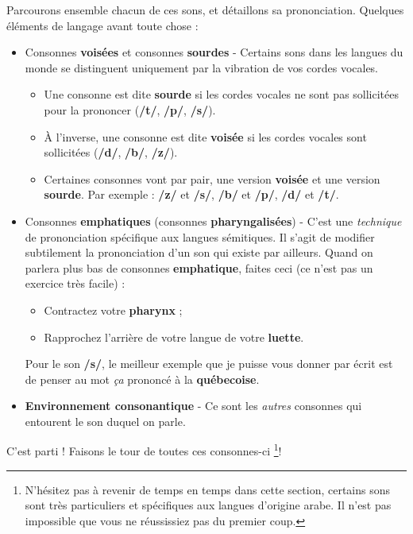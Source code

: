 Parcourons ensemble chacun de ces sons, et détaillons sa prononciation. Quelques éléments de langage avant toute chose :
\begin{itemize}
    \item Consonnes \textbf{voisées} et consonnes \textbf{sourdes} - Certains sons dans les langues du monde se distinguent uniquement par la vibration de vos cordes vocales. 
    \begin{itemize}
        \item Une consonne est dite \textbf{sourde} si les cordes vocales ne sont pas sollicitées pour la prononcer (\textbf{/t/}, \textbf{/p/}, \textbf{/s/}).
        \item À l'inverse, une consonne est dite \textbf{voisée} si les cordes vocales sont sollicitées (\textbf{/d/}, \textbf{/b/}, \textbf{/z/}).
        \item Certaines consonnes vont par pair, une version \textbf{voisée} et une version \textbf{sourde}. Par exemple : \textbf{/z/} et \textbf{/s/}, \textbf{/b/} et \textbf{/p/}, \textbf{/d/} et \textbf{/t/}.
    \end{itemize}
    \item Consonnes \textbf{emphatiques} (consonnes \textbf{pharyngalisées}) - C'est une \textit{technique} de prononciation spécifique aux langues sémitiques. Il s'agit de modifier subtilement la prononciation d'un son qui existe par ailleurs. Quand on parlera plus bas de consonnes \textbf{emphatique}, faites ceci (ce n'est pas un exercice très facile) :
    \begin{itemize}
        \item Contractez votre \textbf{pharynx} ; 
        \item Rapprochez l'arrière de votre langue de votre \textbf{luette}.
    \end{itemize}
    Pour le son \textbf{/s/}, le meilleur exemple que je puisse vous donner par écrit est de penser au mot \textit{ça} prononcé à la \textbf{québecoise}.
    \item \textbf{Environnement consonantique} - Ce sont les \textit{autres} consonnes qui entourent le son duquel on parle.
\end{itemize}

C'est parti ! Faisons le tour de toutes ces consonnes-ci \footnote{N'hésitez pas à revenir de temps en temps dans cette section, certains sons sont très particuliers et spécifiques aux langues d'origine arabe. Il n'est pas impossible que vous ne réussissiez pas du premier coup.}!

